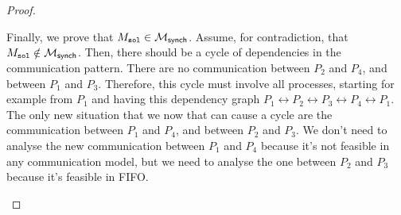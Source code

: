 \begin{proof}
\begin{itemize}
		      Finally, we prove that $M_{\texttt{sol}} \in \mathcal{M}_{\mathsf{synch}}$.
		      Assume, for contradiction, that $M_{\texttt{sol}} \notin \mathcal{M}_{\mathsf{synch}}$.
		      Then, there should be a cycle of dependencies in the communication pattern.
		      There are no communication between $P_2$ and $P_4$, and between $P_1$
		      and $P_3$. Therefore, this cycle must involve all processes, starting
		      for example from $P_1$ and having this dependency graph
		      $P_1\leftrightarrow P_2\leftrightarrow P_3\leftrightarrow P_4\leftrightarrow P_1$.
		      The only new situation that we now that can cause a cycle are the communication
		      between $P_1$ and $P_4$, and between $P_2$ and $P_3$.
		      We don't need to analyse the new communication between $P_1$ and $P_4$ because
		      it's not feasible in any communication model, but we need to analyse the one
		      between $P_2$ and $P_3$ because it's feasible in FIFO.





		      \begin{figure}[!ht]
			      \centering
			      \begin{msc}[draw frame=none, draw head=none, msc keyword=, head height=0px, label distance=0.5ex, foot height=0px, foot distance=0px]{}


\end{msc}
\end{figure}
\end{itemize}
\end{proof}
